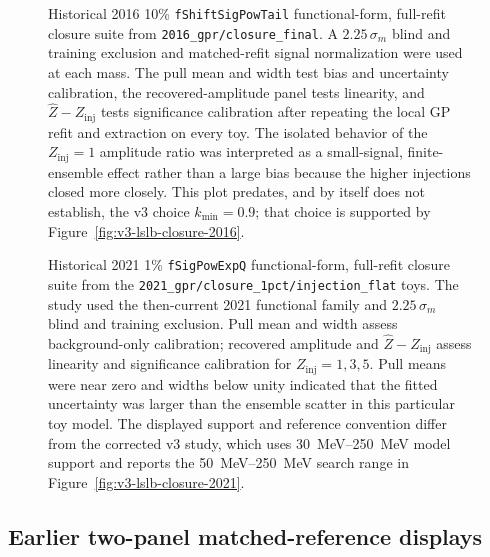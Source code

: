 \begin{figure}[p]
\centering
{}
\caption{Historical 2016 10\% \texttt{fShiftSigPowTail} functional-form, full-refit
closure suite from \texttt{2016\_gpr/closure\_final}. A $2.25\,\sigma_m$ blind and
training exclusion and matched-refit signal normalization were used at each mass.
The pull mean and width test bias and uncertainty calibration, the recovered-amplitude
panel tests linearity, and $\hat Z-Z_{\mathrm{inj}}$ tests significance calibration
after repeating the local GP refit and extraction on every toy. The isolated behavior
of the $Z_{\mathrm{inj}}=1$ amplitude ratio was interpreted as a small-signal,
finite-ensemble effect rather than a large bias because the higher injections closed
more closely. This plot predates, and by itself does not establish, the v3 choice
$k_{\min}=0.9$; that choice is supported by
Figure~\ref{fig:v3-lslb-closure-2016}.}
\label{fig:closure-validation-2016-funcform}
\end{figure}

\begin{figure}[p]
\centering
{}
\caption{Historical 2021 1\% \texttt{fSigPowExpQ} functional-form, full-refit closure
suite from the \texttt{2021\_gpr/closure\_1pct/injection\_flat} toys. The study used
the then-current 2021 functional family and $2.25\,\sigma_m$ blind and training
exclusion. Pull mean and width assess background-only calibration; recovered amplitude
and $\hat Z-Z_{\mathrm{inj}}$ assess linearity and significance calibration for
$Z_{\mathrm{inj}}=1,3,5$. Pull means were near zero and widths below unity indicated
that the fitted uncertainty was larger than the ensemble scatter in this particular
toy model. The displayed support and reference convention differ from the corrected
v3 study, which uses \SIrange{30}{250}{MeV} model support and reports the
\SIrange{50}{250}{MeV} search range in
Figure~\ref{fig:v3-lslb-closure-2021}.}
\label{fig:closure-validation-2021-funcform}
\end{figure}

\FloatBarrier

\subsection{Earlier two-panel matched-reference displays}

